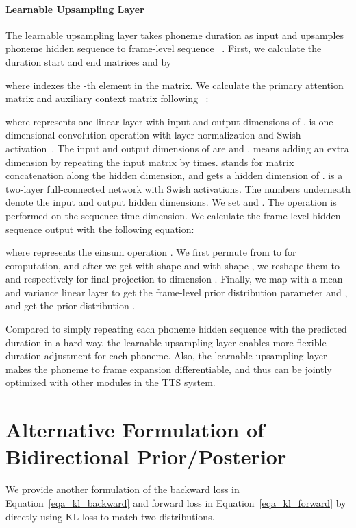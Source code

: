 \documentclass{article}
\theoremstyle{definition}
\begin{document}
\paragraph{Learnable Upsampling Layer}

The learnable upsampling layer  takes phoneme duration  as input and upsamples phoneme hidden sequence  to frame-level sequence ~\citep{elias2021parallel}. First, we calculate the duration start and end matrices  and  by 

where  indexes the -th element in the matrix. We calculate the primary attention matrix  and auxiliary context matrix  following ~\cite{elias2021parallel}:


where  represents one linear layer with input and output dimensions of .  is one-dimensional convolution operation with layer normalization and Swish activation~\cite{ramachandran2017searching}. The input and output dimensions of  are  and .  means adding an extra dimension by repeating the input matrix by  times. 
 stands for matrix concatenation along the hidden dimension, and gets a hidden dimension of .
 is a two-layer full-connected network with Swish activations. The numbers underneath  denote the input and output hidden dimensions. We set  and . The  operation is performed on the sequence time dimension. We calculate the frame-level hidden sequence output  with the following equation:


where  represents the einsum operation . We first permute  from  to  for computation, and after we get  with shape  and  with shape , we reshape them to  and  respectively for final projection to dimension . Finally, we map  with a mean and variance linear layer to get the frame-level prior distribution parameter  and , and get the prior distribution . 


Compared to simply repeating each phoneme hidden sequence with the predicted duration in a hard way, the learnable upsampling layer enables more flexible duration adjustment for each phoneme. Also, the learnable upsampling layer makes the phoneme to frame expansion differentiable, and thus can be jointly optimized with other modules in the TTS system. 




\section{Alternative Formulation of Bidirectional Prior/Posterior}
\label{appendix_bpp}
We provide another formulation of the backward loss  in Equation~\ref{eqa_kl_backward} and forward loss  in Equation~\ref{eqa_kl_forward} by directly using KL loss to match two distributions. 
\end{document}
